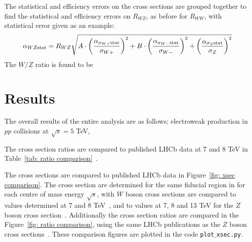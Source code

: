 \documentclass[a4paper]{article}
\begin{document}
The statistical and efficiency errors on the cross sections are grouped together to find the statistical and efficiency errors on $R_{WZ}$, as before for $R_{WW}$, with statistical error given as an example:
\begin{equation}
    \alpha_{WZ \rm stat} = R_{WZ}\sqrt{A \cdot \left(\frac{\alpha_{\sigma_{W+} \rm stat}}{\sigma_{W+}}\right)^2 + B \cdot \left(\frac{\alpha_{\sigma_{W-}\rm stat}}{\sigma_{W-}}\right)^2 + \left(\frac{\alpha_{\sigma_{Z}\rm stat}}{\sigma_Z}\right)^2}
\end{equation}
The $W/Z$ ratio is found to be



%
%
%
%

\section{Results} \label{sec: results}
The overall results of the entire analysis are as follows; electroweak production in $pp$ collisions at $\sqrt{s}=5$ TeV,








The cross section ratios are compared to published LHCb data at 7 and 8 TeV in Table~\ref{tab: ratio comparison}~\cite{7TeV_W_2014,7TeV_Z_2015,8TeV_W+Z_2015}.

The cross sections are compared to published LHCb data in Figure~\ref{fig: xsec comparison}. The cross section are determined for the same fiducial region in for each centre of mass energy $\sqrt{s}$, with $W$ boson cross sections are compared to values determined at 7 and 8 TeV~\cite{7TeV_Z_2015,8TeV_W+Z_2015}, and to values at 7, 8 and 13 TeV for the $Z$ boson cross section~\cite{7TeV_Z_2015,8TeV_W+Z_2015,13TeV_Z_2016}.
Additionally the cross section ratios are compared in the Figure~\ref{fig: ratio comparison}, using the same LHCb publications as the $Z$ boson cross sections~\cite{7TeV_Z_2015,8TeV_W+Z_2015}.
These comparison figures are plotted in the code \texttt{plot$\_$xsec.py}.
\end{document}
